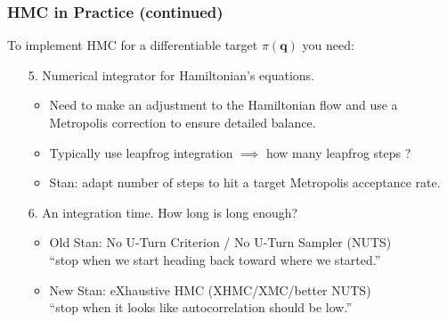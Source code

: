 \documentclass[xcolor=dvipsnames]{beamer}
\begin{document}
\begin{frame}
\frametitle{HMC in Practice (continued)}
To implement HMC for a differentiable target $\pi(\bm{q})$ you need:
\vspace{0.2cm}
\begin{enumerate}
\item[5.] Numerical integrator for Hamiltonian's equations.
\begin{itemize}
\item Need to make an adjustment to the Hamiltonian flow and use a Metropolis correction to ensure detailed balance.
\vspace{0.2cm}
\item Typically use leapfrog integration $\implies$ how many leapfrog steps ?
\vspace{0.2cm}
\item Stan: adapt number of steps to hit a target Metropolis acceptance rate.
\end{itemize}
\vspace{0.2cm}
\item[6.] An integration time. How long is long enough?
\begin{itemize}
\item Old Stan: No U-Turn Criterion / No U-Turn Sampler (NUTS) \\
\vspace{0.2cm}
``stop when we start heading back toward where we started.''
\vspace{0.2cm}
\item New Stan: eXhaustive HMC (XHMC/XMC/better NUTS) \\
\vspace{0.2cm}
``stop when it looks like autocorrelation should be low.''
\vspace{0.2cm}
\end{itemize}
\end{enumerate}
\end{frame}
\end{document}
